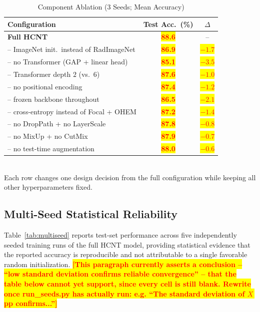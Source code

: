 \documentclass[conference]{IEEEtran}
\newcommand{\HCNT}{\textsc{HCNT}\xspace}
\newcommand{\RESULT}[1]{\colorbox{yellow}{\textcolor{red}{\textbf{#1}}}}
\begin{document}
\begin{table}[t]
  \centering
  \caption{Component Ablation (3 Seeds; Mean Accuracy)}
  \label{tab:ablation}
  \renewcommand{\arraystretch}{1.25}
  \begin{tabular}{lcc}
    \toprule
    \textbf{Configuration} & \textbf{Test Acc.\ (\%)} & \textbf{$\Delta$} \\
    \midrule
    \textbf{Full \HCNT}                        & \RESULT{\textbf{88.6}} & --      \\
    \;\;-- ImageNet init.\ instead of RadImageNet & \RESULT{86.9} & \RESULT{$-1.7$} \\
    \;\;-- no Transformer (GAP + linear head)  & \RESULT{85.1} & \RESULT{$-3.5$} \\
    \;\;-- Transformer depth $2$ (vs.\ $6$)    & \RESULT{87.6} & \RESULT{$-1.0$} \\
    \;\;-- no positional encoding              & \RESULT{87.4} & \RESULT{$-1.2$} \\
    \;\;-- frozen backbone throughout          & \RESULT{86.5} & \RESULT{$-2.1$} \\
    \;\;-- cross-entropy instead of Focal + OHEM & \RESULT{87.2} & \RESULT{$-1.4$} \\
    \;\;-- no DropPath + no LayerScale         & \RESULT{87.8} & \RESULT{$-0.8$} \\
    \;\;-- no MixUp + no CutMix                & \RESULT{87.9} & \RESULT{$-0.7$} \\
    \;\;-- no test-time augmentation           & \RESULT{88.0} & \RESULT{$-0.6$} \\
    \bottomrule
  \end{tabular}
  \medskip\\
  \small Each row changes one design decision from the full configuration
  while keeping all other hyperparameters fixed. %
\end{table}

\subsection{Multi-Seed Statistical Reliability}

Table~\ref{tab:multiseed} reports test-set performance across five
independently seeded training runs of the full \HCNT model, providing
statistical evidence that the reported accuracy is reproducible and not
attributable to a single favorable random initialization. \RESULT{[This
paragraph currently asserts a conclusion -- ``low standard deviation
confirms reliable convergence'' -- that the table below cannot yet support,
since every cell is still blank. Rewrite once run\_seeds.py has actually
run: e.g. ``The standard deviation of $X$\,pp confirms...'']}
\end{document}
